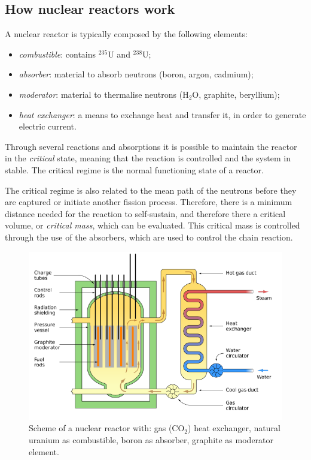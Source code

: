 \subsection{How nuclear reactors work}
A nuclear reactor is typically composed by the following elements:
\begin{itemize}
    \item \emph{combustible}: contains $^{235}\mbox{U}$ and $^{238}\mbox{U}$;
    \item \emph{absorber}: material to absorb neutrons (boron, argon, cadmium);
    \item \emph{moderator}: material to thermalise neutrons (H$_2$O, graphite, beryllium);
    \item \emph{heat exchanger}: a means to exchange heat and transfer it, in order to generate electric current.
\end{itemize}

Through several reactions and absorptions it is possible to maintain the reactor in the \emph{critical} state, meaning that the reaction is controlled and the system in stable. The critical regime is the normal functioning state of a reactor. 

The critical regime is also related to the mean path of the neutrons before they are captured or initiate another fission process. Therefore, there is a minimum distance needed for the reaction to self-sustain, and therefore there a critical volume, or  \emph{critical mass}, which can be evaluated. This critical mass is controlled through the use of the absorbers, which are used to control the chain reaction.

\begin{figure}
    \centering
    \includegraphics{Figures/nuclear-physics3-fig9.pdf}
    \caption{Scheme of a nuclear reactor with: gas (CO$_2$) heat exchanger, natural uranium as combustible, boron as absorber, graphite as moderator element.}
    \label{fig:my_label}
\end{figure}


